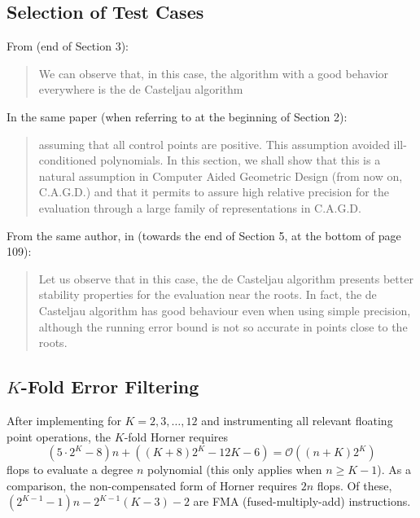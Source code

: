 \documentclass[letterpaper,10pt]{article}
\begin{document}
\subsection{Selection of Test Cases}

From \cite{Delgado2015} (end of Section 3):

\begin{quote}
  We can observe that, in this case, the algorithm with a good
  behavior everywhere is the de Casteljau algorithm
\end{quote}

\noindent In the same paper (when referring to \cite{Bezerra2013} at the
beginning of Section 2):

\begin{quote}
  assuming that all control points are positive. This assumption avoided
  ill-conditioned polynomials. In this section, we shall show that this is
  a natural assumption in Computer Aided Geometric Design (from now on,
  C.A.G.D.) and that it permits to assure high relative precision for the
  evaluation through a large family of representations in C.A.G.D.
\end{quote}

\noindent From the same author, in \cite{Mainar2005} (towards the
end of Section 5, at the bottom of page 109):

\begin{quote}
  Let us observe that in this case, the de Casteljau algorithm presents
  better stability properties for the evaluation near the roots. In fact,
  the de Casteljau algorithm has good behaviour even when using simple
  precision, although the running error bound is not so accurate in points
  close to the roots.
\end{quote}

\subsection{\texorpdfstring{\(K\)}{K}-Fold Error Filtering}

After implementing for \(K = 2, 3, \ldots, 12\) and instrumenting all
relevant floating point operations, the \(K\)-fold Horner requires
\[(5 \cdot 2^K - 8)n + \left((K + 8) 2^K - 12K - 6\right) =
\mathcal{O}\left((n + K)2^K\right)\]
flops to evaluate a degree \(n\) polynomial (this only applies when
\(n \geq K - 1\)). As a comparison, the
non-compensated form of Horner requires \(2n\) flops. Of these,
\(\left(2^{K - 1} - 1\right)n - 2^{K - 1}(K - 3) - 2\) are
FMA (fused-multiply-add) instructions.
\end{document}

